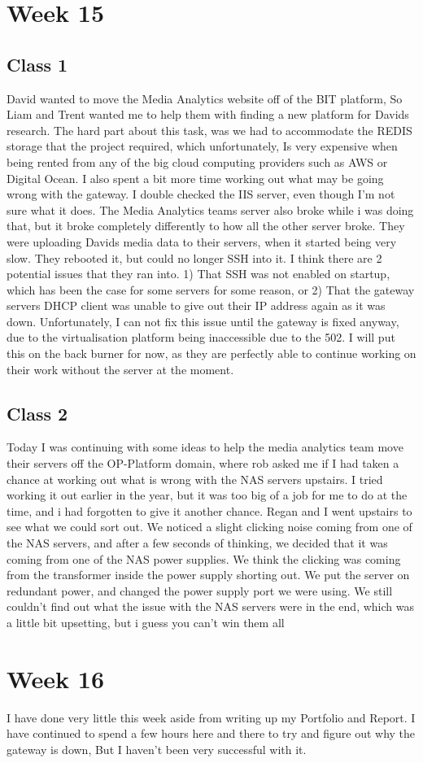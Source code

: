\documentclass{article}
\begin{document}
\section{Week 15}
\subsection{Class 1}
David wanted to move the Media Analytics website off of the BIT platform, So Liam and Trent wanted me to help them with finding a new platform for Davids research.
The hard part about this task, was we had to accommodate the REDIS storage that the project required, which unfortunately, Is very expensive when being rented from
any of the big cloud computing providers such as AWS or Digital Ocean. I also spent a bit more time working out what may be going wrong with the gateway. I double
checked the IIS server, even though I'm not sure what it does. The Media Analytics teams server also broke while i was doing that, but it broke completely differently
to how all the other server broke. They were uploading Davids media data to their servers, when it started being very slow. They rebooted it, but could no longer SSH into it. I think there are 2 potential issues that they ran into. 1) That SSH was not enabled on startup, which has been the case for some servers for some reason,
or 2) That the gateway servers DHCP client was unable to give out their IP address again as it was down. Unfortunately, I can not fix this issue until the gateway
is fixed anyway, due to the virtualisation platform being inaccessible due to the 502. I will put this on the back burner for now, as they are perfectly able to
continue working on their work without the server at the moment.
\subsection{Class 2}
Today I was continuing with some ideas to help the media analytics team move their servers off the OP-Platform domain, where rob asked me if I had taken a chance
at working out what is wrong with the NAS servers upstairs. I tried working it out earlier in the year, but it was too big of a job for me to do at the time,
and i had forgotten to give it another chance. Regan and I went upstairs to see what we could sort out. We noticed a slight clicking noise coming from one of the NAS
servers, and after a few seconds of thinking, we decided that it was coming from one of the NAS power supplies. We think the clicking was coming from the transformer
inside the power supply shorting out. We put the server on redundant power, and changed the power supply port we were using. We still couldn't find out what the issue 
with the NAS servers were in the end, which was a little bit upsetting, but i guess you can't win them all
\section{Week 16}
I have done very little this week aside from writing up my Portfolio and Report. I have continued to spend a few hours here and there to try and figure out
why the gateway is down, But I haven't been very successful with it.
\end{document}
